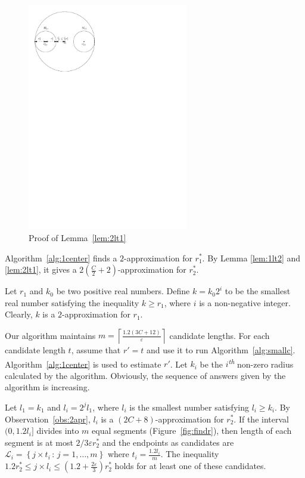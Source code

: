 \documentclass[envcountsame]{cls/cccg15}
\newcommand{\nth}{\textsuperscript{\textit{th}} }
\newcommand{\set}[1]{\left\{ #1 \right\}}
\newcommand{\ceil}[1]{\left\lceil{#1}\right\rceil}
\newcommand{\provided}{\,:\,}
\newcommand{\lee}{\leqslant}
\newcommand{\gee}{\geqslant}
\renewcommand{\le}{\lee}
\renewcommand{\ge}{\gee}
\newcommand{\eps}{\varepsilon}
\begin{document}
\begin{figure}[h]
	\centering
	\includegraphics[width=19em]{figs/2lt1}
	\caption{Proof of Lemma~\ref{lem:2lt1}}
	\label{fig:2lt1}
\end{figure}

Algorithm~\ref{alg:1center} finds a $2$-approximation for $r_1^*$. By Lemma \ref{lem:1lt2} and \ref{lem:2lt1}, it gives a $2\left(\frac{C}{2} + 2\right)$-approximation for $r_2^*$.

\begin{obs}
\label{obs:2apr}
Let $r_1$ and $k_0$ be two positive real numbers. Define $k=k_0 2^i$ to be the smallest real number satisfying the inequality $k \ge r_1$, where $i$ is a non-negative integer. Clearly, $k$ is a $2$-approximation for $r_1$.
\end{obs}


Our algorithm maintains $m=\ceil{\frac{1.2(3C+12)}{\eps}}$ candidate lengths.
For each candidate length $t$, assume that $r' = t$ and use it to run Algorithm~\ref{alg:smallc}. Algorithm~\ref{alg:1center} is used to estimate $r'$. Let $k_i$ be the $i$\nth non-zero radius calculated by the algorithm. Obviously, the sequence of answers given by the algorithm is increasing.

Let $l_1=k_1$ and $l_i=2^j l_1$, where $l_i$ is the smallest number satisfying $l_i \ge k_i$. By Observation~\ref{obs:2apr}, $l_i$ is a $(2C + 8)$-approximation for $r_2^*$. If the interval $(0, 1.2 l_i]$ divides into $m$ equal segments (Figure~\ref{fig:findr}), then length of each segment is at most $2/3 \eps r_2^*$ and the endpoints as candidates are $\mathcal{L}_i = \set{j \times t_i \provided j = 1, \dots, m}$ where $t_i = \frac{1.2 l_i}{m}$. 
The inequality $1.2 r_2^* \le j \times l_i \le (1.2 + \frac{2\eps}{3})r_2^*$ holds for at least one of these candidates.
\end{document}
